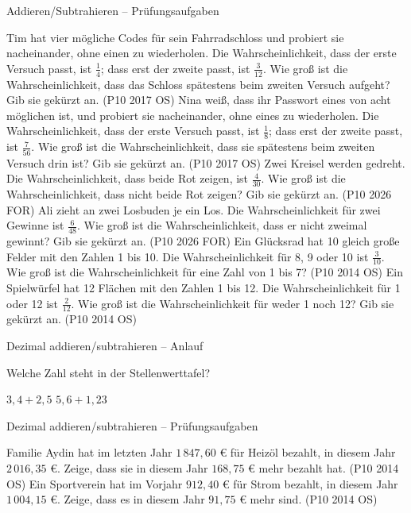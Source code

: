\begin{aufgabe}{Addieren/Subtrahieren – Prüfungsaufgaben}
\begin{teile}
\steil Tim hat vier mögliche Codes für sein Fahrradschloss und probiert sie nacheinander, ohne einen zu wiederholen. Die Wahrscheinlichkeit, dass der erste Versuch passt, ist $\frac{1}{4}$; dass erst der zweite passt, ist $\frac{3}{12}$. Wie groß ist die Wahrscheinlichkeit, dass das Schloss spätestens beim zweiten Versuch aufgeht? Gib sie gekürzt an. \hfill (P10 2017 OS)
\steil Nina weiß, dass ihr Passwort eines von acht möglichen ist, und probiert sie nacheinander, ohne eines zu wiederholen. Die Wahrscheinlichkeit, dass der erste Versuch passt, ist $\frac{1}{8}$; dass erst der zweite passt, ist $\frac{7}{56}$. Wie groß ist die Wahrscheinlichkeit, dass sie spätestens beim zweiten Versuch drin ist? Gib sie gekürzt an. \hfill (P10 2017 OS)
\teil Zwei Kreisel werden gedreht. Die Wahrscheinlichkeit, dass beide Rot zeigen, ist $\frac{4}{30}$. Wie groß ist die Wahrscheinlichkeit, dass nicht beide Rot zeigen? Gib sie gekürzt an. \hfill (P10 2026 FOR)
\teil Ali zieht an zwei Losbuden je ein Los. Die Wahrscheinlichkeit für zwei Gewinne ist $\frac{6}{48}$. Wie groß ist die Wahrscheinlichkeit, dass er nicht zweimal gewinnt? Gib sie gekürzt an. \hfill (P10 2026 FOR)
\teil Ein Glücksrad hat 10 gleich große Felder mit den Zahlen 1 bis 10. Die Wahrscheinlichkeit für 8, 9 oder 10 ist $\frac{3}{10}$. Wie groß ist die Wahrscheinlichkeit für eine Zahl von 1 bis 7? \hfill (P10 2014 OS)
\teil Ein Spielwürfel hat 12 Flächen mit den Zahlen 1 bis 12. Die Wahrscheinlichkeit für 1 oder 12 ist $\frac{2}{12}$. Wie groß ist die Wahrscheinlichkeit für weder 1 noch 12? Gib sie gekürzt an. \hfill (P10 2014 OS)
\end{teile}
\end{aufgabe}

\begin{aufgabe}{Dezimal addieren/subtrahieren – Anlauf}
\begin{teile}
\teil Welche Zahl steht in der Stellenwerttafel?

\leerfeld
\teil $3{,}4 + 2{,}5$
\teil $5{,}6 + 1{,}23$
\end{teile}
\end{aufgabe}

\begin{aufgabe}{Dezimal addieren/subtrahieren – Prüfungsaufgaben}
\begin{teile}
\teil Familie Aydin hat im letzten Jahr $1\,847{,}60$ € für Heizöl bezahlt, in diesem Jahr $2\,016{,}35$ €. Zeige, dass sie in diesem Jahr $168{,}75$ € mehr bezahlt hat. \hfill (P10 2014 OS)
\teil Ein Sportverein hat im Vorjahr $912{,}40$ € für Strom bezahlt, in diesem Jahr $1\,004{,}15$ €. Zeige, dass es in diesem Jahr $91{,}75$ € mehr sind. \hfill (P10 2014 OS)
\end{teile}
\end{aufgabe}

